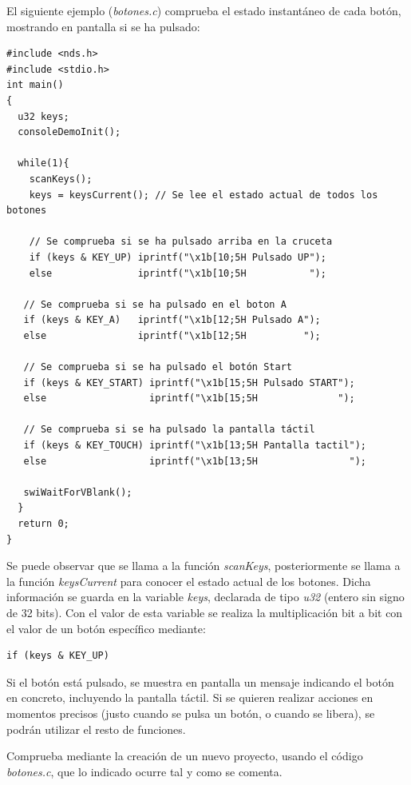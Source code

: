 El siguiente ejemplo (\textit{botones.c}) comprueba el estado instantáneo de cada botón, mostrando en pantalla si se ha pulsado: 
\begin{lstlisting}
#include <nds.h>
#include <stdio.h>
int main()
{
  u32 keys;
  consoleDemoInit();

  while(1){
    scanKeys();
    keys = keysCurrent(); // Se lee el estado actual de todos los botones

    // Se comprueba si se ha pulsado arriba en la cruceta
    if (keys & KEY_UP) iprintf("\x1b[10;5H Pulsado UP");
    else               iprintf("\x1b[10;5H           ");

   // Se comprueba si se ha pulsado en el boton A
   if (keys & KEY_A)   iprintf("\x1b[12;5H Pulsado A");
   else                iprintf("\x1b[12;5H          ");

   // Se comprueba si se ha pulsado el botón Start
   if (keys & KEY_START) iprintf("\x1b[15;5H Pulsado START");
   else                  iprintf("\x1b[15;5H              ");

   // Se comprueba si se ha pulsado la pantalla táctil
   if (keys & KEY_TOUCH) iprintf("\x1b[13;5H Pantalla tactil");
   else                  iprintf("\x1b[13;5H                ");

   swiWaitForVBlank();
  }
  return 0;
}
\end{lstlisting}

Se puede observar que se llama a la función \textit{scanKeys}, posteriormente se llama a la función \textit{keysCurrent} para conocer el estado actual de los botones. Dicha información se guarda en la variable \textit{keys}, declarada de tipo \textit{u32} (entero sin signo de 32 bits). Con el valor de esta variable se realiza la multiplicación bit a bit con el valor de un botón específico mediante:
\begin{lstlisting}
if (keys & KEY_UP)
\end{lstlisting}

Si el botón está pulsado, se muestra en pantalla un mensaje indicando el  botón en concreto, incluyendo la pantalla táctil. Si se quieren realizar
acciones en momentos precisos (justo cuando se pulsa un botón, o cuando se libera), se podrán utilizar el resto de funciones.

\begin{exercise}
Comprueba mediante la creación de un nuevo proyecto, usando el código \textit{botones.c}, que lo indicado ocurre tal y como se comenta.
\end{exercise}


